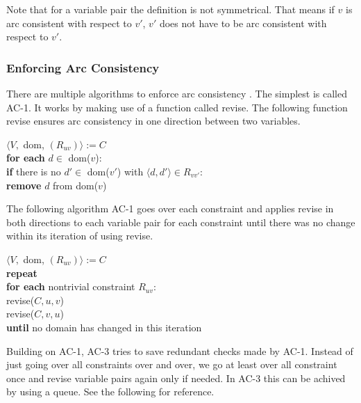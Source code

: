 Note that for a variable pair the definition is not symmetrical. That means if $v$ is arc consistent with respect to $v'$, $v'$ does not have to be arc consistent with respect to $v'$.

\subsubsection{Enforcing Arc Consistency}

There are multiple algorithms to enforce arc consistency \cite{arc_studied:1977} \cite{arc_again:1994}. The simplest is called AC-1. It works by making use of a function called revise. The following function revise ensures arc consistency in one direction between two variables.

\begin{tcolorbox}[title={\textbf{function} revise($C,v,v'$):}]
	$\langle V,$ dom, $(R_{uv})\rangle := C$ \\
	\textbf{for each} $d \in$ dom($v$): \\
	\textbf{if} there is no $d' \in$ dom($v'$) with $\langle d, d' \rangle \in R_{vv'}$: \\
	\textbf{remove} $d$ from dom($v$)
\end{tcolorbox}

The following algorithm AC-1 goes over each constraint and applies revise in both directions to each variable pair for each constraint until there was no change within its iteration of using revise.

\begin{tcolorbox}[title={\textbf{function} AC-1($C$):}]
	$\langle V,$ dom, $(R_{uv})\rangle := C$ \\
	\textbf{repeat} \\
	\textbf{for each} nontrivial constraint $R_{uv}$: \\
	revise($C, u, v$) \\
	revise($C, v, u$) \\
	\textbf{until} no domain has changed in this iteration
\end{tcolorbox}

Building on AC-1, AC-3 tries to save redundant checks made by AC-1. Instead of just going over all constraints over and over, we go at least over all constraint once and revise variable pairs again only if needed. In AC-3 this can be achived by using a queue. See the following for reference.

